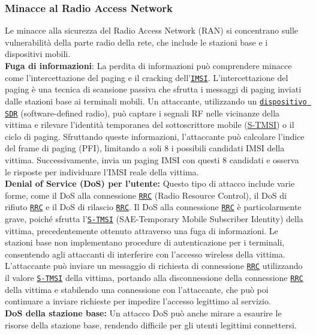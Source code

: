 \documentclass[english]{article}
\begin{document}
\subsubsection{Minacce al Radio Access Network}
Le minacce alla sicurezza del Radio Access Network (RAN) si concentrano sulle
vulnerabilità della parte radio della rete, che include le stazioni base e i
dispositivi mobili. \\[0.2cm]
\textbf{Fuga di informazioni}:
La perdita di informazioni può comprendere minacce come l'intercettazione del paging e
il cracking dell'\texttt{\hyperlink{IMSI}{IMSI}}.
L'intercettazione del paging è una tecnica di scansione passiva
che sfrutta i messaggi di paging inviati dalle stazioni base ai terminali mobili.
Un attaccante, utilizzando un \texttt{\hyperlink{SDR}{dispositivo SDR}} (software-defined radio),
può captare i segnali RF nelle vicinanze della vittima e rilevare l'identità temporanea del
sottoscrittore mobile (\hyperlink{S-TMSI}{S-TMSI}) o il ciclo di paging. Sfruttando queste informazioni,
l'attaccante può calcolare l'indice del frame di paging (PFI),
limitando a soli 8 i possibili candidati IMSI della vittima.
Successivamente, invia un paging IMSI con questi 8 candidati e
osserva le risposte per individuare l'IMSI reale della vittima.
\\[0.2cm]
\textbf{Denial of Service (DoS) per l'utente:} Questo tipo di attacco include varie forme,
come il DoS alla connessione \texttt{\hyperlink{RRC}{RRC}} (Radio Resource Control),
il DoS di rifiuto \texttt{\hyperlink{RRC}{RRC}}
e il DoS di rilascio \texttt{\hyperlink{RRC}{RRC}}.\@
Il DoS alla connessione \texttt{\hyperlink{RRC}{RRC}} è particolarmente grave, poiché sfrutta
l'\texttt{\hyperlink{S-TMSI}{S-TMSI}} (SAE-Temporary Mobile Subscriber Identity)
della vittima, precedentemente ottenuto attraverso una fuga di informazioni.
Le stazioni base non implementano procedure di autenticazione per i terminali,
consentendo agli attaccanti di interferire con l'accesso wireless della vittima.
L'attaccante può inviare un messaggio di richiesta di connessione
\texttt{\hyperlink{RRC}{RRC}} utilizzando il valore
\texttt{\hyperlink{S-TMSI}{S-TMSI}} della vittima, portando alla disconnessione della connessione
\texttt{\hyperlink{RRC}{RRC}} della vittima e stabilendo una connessione con l'attaccante,
che può poi continuare a inviare richieste per impedire l'accesso legittimo al servizio.
\\[0.2cm]
\textbf{DoS della stazione base:} Un attacco DoS può anche mirare a esaurire le risorse
della stazione base, rendendo difficile per gli utenti legittimi connettersi.
\end{document}
